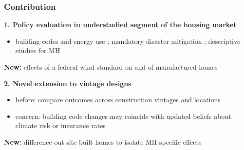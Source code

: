 \documentclass[11pt,xcolor={dvipsnames},hyperref={pdftex,pdfpagemode=UseNone,hidelinks,pdfdisplaydoctitle=true},usepdftitle=false,aspectratio=169]{beamer}
\newcommand{\gc}[1]{{\footnotesize\textcolor{gray}{#1}}}
\begin{document}
\begin{frame}
    \frametitle{Contribution}

    \small

    \textbf{1. Policy evaluation in understudied segment of the housing market}
    \begin{itemize}
        \item building codes and energy use \gc{\citep{jacobsen_are_2013, levinson_how_2016}}; mandatory disaster mitigation \gc{\citep{simmons_economic_2018, dehring_coastal_2013, baylis_mandated_2026}}; descriptive studies for MH \gc{\citep{simmons_manufactured_2008, kevin_r_grosskopf_manufactured_2005}}
    \end{itemize}

    \hspace{1em} \so \textbf{New:} effects of a federal wind standard on  and  of manufactured homes

    \vspace{1.2em}

    \textbf{2. Novel extension to vintage designs}
    \begin{itemize}
        \item before: compare outcomes across construction vintages and locations
        \item concern: building code changes may coincide with updated beliefs about climate risk or insurance rates
    \end{itemize}

    \hspace{1em} \so \textbf{New:} difference out site-built homes  to isolate MH-specific effects

\end{frame}



\begin{frame}
\end{frame}
\end{document}
